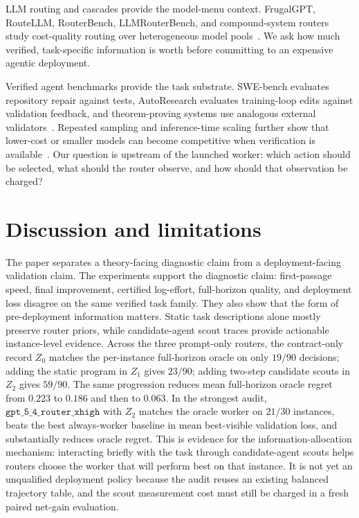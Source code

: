 \documentclass{article}
\begin{document}
LLM routing and cascades provide the model-menu context.
FrugalGPT, RouteLLM, RouterBench, LLMRouterBench, and compound-system routers study cost-quality routing over heterogeneous model pools~\citep{chen2023frugalgpt,ong2024routellm,hu2024routerbench,anonymous2026llmrouterbench,chen2025optimizing,yue2025masrouter,zaharia2024compound}.
We ask how much verified, task-specific information is worth before committing to an expensive agentic deployment.

Verified agent benchmarks provide the task substrate.
SWE-bench evaluates repository repair against tests, AutoResearch evaluates training-loop edits against validation feedback, and theorem-proving systems use analogous external validators~\citep{jimenez2024swebench,karpathy2026autoresearch}.
Repeated sampling and inference-time scaling further show that lower-cost or smaller models can become competitive when verification is available~\citep{brown2024monkeys,snell2025testtime,wu2025inference,osca2024}.
Our question is upstream of the launched worker: which action should be selected, what should the router observe, and how should that observation be charged?

\section{Discussion and limitations}
\label{sec:discussion}

The paper separates a theory-facing diagnostic claim from a deployment-facing validation claim.
The experiments support the diagnostic claim: first-passage speed, final improvement, certified log-effort, full-horizon quality, and deployment loss disagree on the same verified task family.
They also show that the form of pre-deployment information matters.
Static task descriptions alone mostly preserve router priors, while candidate-agent scout traces provide actionable instance-level evidence.
Across the three prompt-only routers, the contract-only record \(Z_0\) matches the per-instance full-horizon oracle on only \(19/90\) decisions; adding the static program in \(Z_1\) gives \(23/90\); adding two-step candidate scouts in \(Z_2\) gives \(59/90\).
The same progression reduces mean full-horizon oracle regret from \(0.223\) to \(0.186\) and then to \(0.063\).
In the strongest audit, \(\texttt{gpt\_5\_4\_router\_xhigh}\) with \(Z_2\) matches the oracle worker on \(21/30\) instances, beats the best always-worker baseline in mean best-visible validation loss, and substantially reduces oracle regret.
This is evidence for the information-allocation mechanism: interacting briefly with the task through candidate-agent scouts helps routers choose the worker that will perform best on that instance.
It is not yet an unqualified deployment policy because the audit reuses an existing balanced trajectory table, and the scout measurement cost must still be charged in a fresh paired net-gain evaluation.
\end{document}

